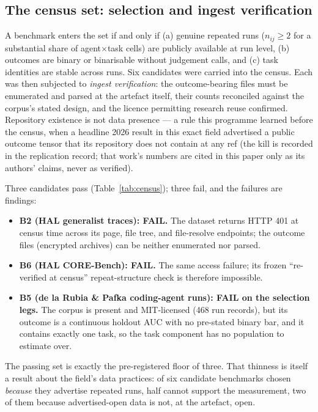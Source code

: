 \documentclass[11pt]{article}
\begin{document}
\subsection{The census set: selection and ingest verification}

A benchmark enters the set if and only if (a) genuine repeated runs
($n_{ij} \geq 2$ for a substantial share of agent$\times$task cells)
are publicly available at run level, (b) outcomes are binary or
binarisable without judgement calls, and (c) task identities are
stable across runs. Six candidates were carried into the census. Each
was then subjected to \emph{ingest verification}: the outcome-bearing
files must be enumerated and parsed at the artefact itself, their
counts reconciled against the corpus's stated design, and the licence
permitting research reuse confirmed. Repository existence is not data
presence --- a rule this programme learned before the census, when a
headline 2026 result in this exact field advertised a public outcome
tensor that its repository does not contain at any ref (the kill is
recorded in the replication record; that work's numbers are cited in
this paper only as its authors' claims, never as verified).

Three candidates pass (Table~\ref{tab:census}); three fail, and the
failures are findings:

\begin{itemize}
\item \textbf{B2 (HAL generalist traces): FAIL.} The dataset returns
HTTP 401 at census time across its page, file tree, and file-resolve
endpoints; the outcome files (encrypted archives) can be neither
enumerated nor parsed.
\item \textbf{B6 (HAL CORE-Bench): FAIL.} The same access failure;
its frozen ``re-verified at census'' repeat-structure check is
therefore impossible.
\item \textbf{B5 (de la Rubia \& Pafka coding-agent runs): FAIL on the
selection legs.} The corpus is present and MIT-licensed (468 run
records), but its outcome is a continuous holdout AUC with no
pre-stated binary bar, and it contains exactly one task, so the task
component has no population to estimate over.
\end{itemize}

The passing set is exactly the pre-registered floor of three. That
thinness is itself a result about the field's data practices: of six
candidate benchmarks chosen \emph{because} they advertise repeated
runs, half cannot support the measurement, two of them because
advertised-open data is not, at the artefact, open.
\end{document}
